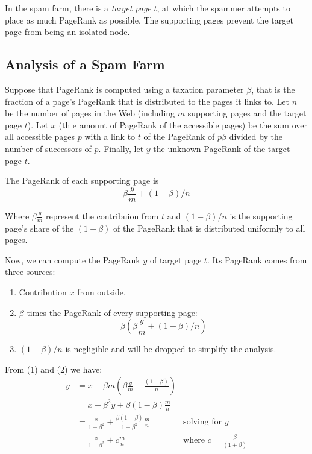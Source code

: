 In the spam farm, there is a \textit{target page} $t$, at which the spammer attempts to place as much PageRank as possible. The supporting pages prevent the target page from being an isolated node.

\subsection{Analysis of a Spam Farm}\label{subsec:analysis-spam-farm}

Suppose that PageRank is computed using a taxation parameter $\beta$, that is the fraction of a page's PageRank that is distributed to the pages it links to. Let $n$ be the number of pages in the Web (including $m$ supporting pages and the target page $t$). Let $x$ (th e amount of PageRank of the accessible pages) be the sum over all accessible pages $p$ with a link to $t$ of the PageRank of $p \beta$ divided by the number of successors of $p$. Finally, let $y$ the unknown PageRank of the target page $t$.

The PageRank of each supporting page is
\begin{equation*}
    \beta \frac{y}{m} + (1 - \beta) / n
\end{equation*}

Where $\beta \frac{y}{m}$  represent the contribuion from $t$ and $(1 - \beta) / n$ is the supporting page's share of the $(1 - \beta)$ of the PageRank that is distributed uniformly to all pages.

Now, we can compute the PageRank $y$ of target page $t$. Its PageRank comes from three sources:
\begin{enumerate}
    \item Contribution $x$ from outside.
    \item $\beta$ times the PageRank of every supporting page:
    \begin{equation*}
        \beta \left(\beta \frac{y}{m} + (1 - \beta) / n\right)
    \end{equation*}
    \item $(1 - \beta)/n$ is negligible and will be dropped to simplify the analysis.
\end{enumerate}

\noindent From (1) and (2) we have:
\begin{align*}
    y & = x + \beta m \left(\beta \frac{y}{m} + \frac{(1 - \beta)}{n}\right) & \\
      & = x + \beta^2 y + \beta (1 - \beta) \frac{m}{n} & \\
      & = \frac{x}{1 - \beta^2} + \frac{\beta (1 - \beta)}{1 - \beta^2} \frac{m}{n} & \text{solving for } y \\
      & = \frac{x}{1 - \beta^2} + c \frac{m}{n} & \text{where } c = \frac{\beta}{(1 + \beta)}   
\end{align*}

